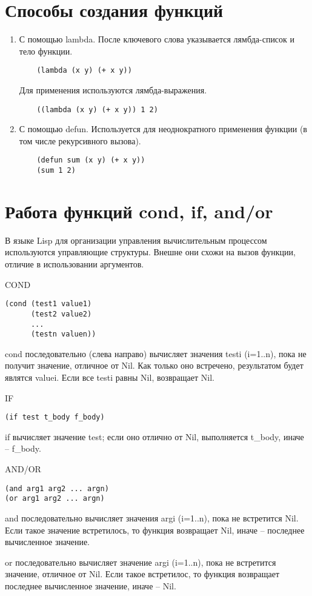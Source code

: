\documentclass[14pt,a4paper]{scrreprt}
\begin{document}
\section{Способы создания функций}

\begin{enumerate}
	\item С помощью lambda. После ключевого слова указывается лямбда-список и тело функции. 
	\begin{lstlisting}
	(lambda (x y) (+ x y))
	\end{lstlisting}
	Для применения используются лямбда-выражения.
	\begin{lstlisting}
	((lambda (x y) (+ x y)) 1 2)
	\end{lstlisting}
	\item С помощью defun. Используется для неоднократного применения функции (в том числе рекурсивного вызова).
	\begin{lstlisting}
	(defun sum (x y) (+ x y))
	(sum 1 2)
	\end{lstlisting}
\end{enumerate}

\section{Работа функций cond, if, and/or}

В языке Lisp для организации управления вычислительным процессом используются управляющие структуры. Внешне они схожи на вызов функции, отличие в использовании аргументов.\newpage

COND
\begin{lstlisting}
(cond (test1 value1)
	  (test2 value2)
	  ...
	  (testn valuen))
\end{lstlisting}

cond последовательно (слева направо) вычисляет значения testi (i=1..n), пока не получит значение, отличное от Nil. Как только оно встречено, результатом будет являтся valuei. Если все testi равны Nil, возвращает Nil.

IF
\begin{lstlisting}
(if test t_body f_body)
\end{lstlisting}

if вычисляет значение test; если оно отлично от Nil, выполняется t\_body, иначе -- f\_body.

AND/OR
\begin{lstlisting}
(and arg1 arg2 ... argn)
(or arg1 arg2 ... argn)
\end{lstlisting}

and последовательно вычисляет значения argi (i=1..n), пока не встретится Nil. Если такое значение встретилось, то функция возвращает Nil, иначе -- последнее вычисленное значение.

or последовательно вычисляет значение argi (i=1..n), пока не встретится значение, отличное от Nil. Если такое встретилос, то функция возвращает последнее вычисленное значение, иначе -- Nil.
\end{document}
